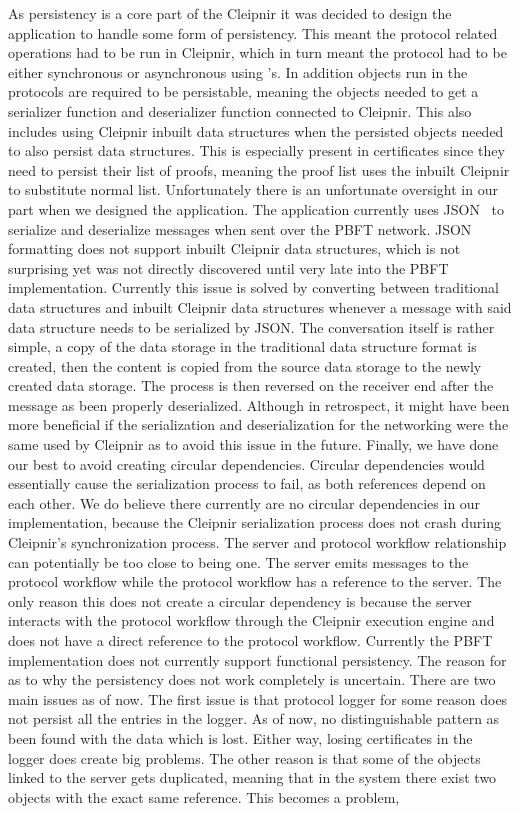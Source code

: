 As persistency is a core part of the Cleipnir it was decided to design the application to handle some form of persistency. This meant the protocol related operations had to be run in Cleipnir, which in turn meant the protocol had to be either synchronous or asynchronous using 's. In addition objects run in the protocols are required to be persistable, meaning the objects needed to get a serializer function and deserializer function connected to Cleipnir. This also includes using Cleipnir inbuilt data structures when the persisted objects needed to also persist data structures. This is especially present in certificates since they need to persist their list of proofs, meaning the proof list uses the inbuilt Cleipnir  to substitute normal list. Unfortunately there is an unfortunate oversight in our part when we designed the application. The application currently uses JSON~\cite{WEB:NewJSON} to serialize and deserialize messages when sent over the PBFT network. JSON formatting does not support inbuilt Cleipnir data structures, which is not surprising yet was not directly discovered until very late into the PBFT implementation. Currently this issue is solved by converting between traditional data structures and inbuilt Cleipnir data structures whenever a message with said data structure needs to be serialized by JSON. The conversation itself is rather simple, a copy of the data storage in the traditional data structure format is created, then the content is copied from the source data storage to the newly created data storage. The process is then reversed on the receiver end after the message as been properly deserialized. Although in retrospect, it might have been more beneficial if the serialization and deserialization for the networking were the same used by Cleipnir as to avoid this issue in the future. Finally, we have done our best to avoid creating circular dependencies. Circular dependencies would essentially cause the serialization process to fail, as both references depend on each other. We do believe there currently are no circular dependencies in our implementation, because the Cleipnir serialization process does not crash during Cleipnir's synchronization process. The server and protocol workflow relationship can potentially be too close to being one. The server emits messages to the protocol workflow while the protocol workflow has a reference to the server. The only reason this does not create a circular dependency is because the server interacts with the protocol workflow through the Cleipnir execution engine and does not have a direct reference to the protocol workflow. Currently the PBFT implementation does not currently support functional persistency. The reason for as to why the persistency  does not work completely is uncertain. There are two main issues as of now. The first issue is that protocol logger for some reason does not persist all the entries in the logger. As of now, no distinguishable pattern as been found with the data which is lost. Either way, losing certificates in the logger does create big problems. The other reason is that some of the  objects linked to the server gets duplicated, meaning that in the system there exist two  objects with the exact same reference. This becomes a problem, 